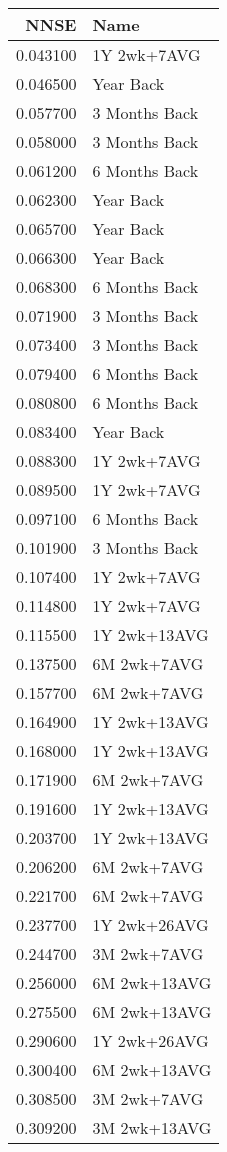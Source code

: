 \begin{tabular}{rl}
NNSE & Name \\
\hline
0.043100 & 1Y 2wk+7AVG \\
0.046500 & Year Back \\
0.057700 & 3 Months Back \\
0.058000 & 3 Months Back \\
0.061200 & 6 Months Back \\
0.062300 & Year Back \\
0.065700 & Year Back \\
0.066300 & Year Back \\
0.068300 & 6 Months Back \\
0.071900 & 3 Months Back \\
0.073400 & 3 Months Back \\
0.079400 & 6 Months Back \\
0.080800 & 6 Months Back \\
0.083400 & Year Back \\
0.088300 & 1Y 2wk+7AVG \\
0.089500 & 1Y 2wk+7AVG \\
0.097100 & 6 Months Back \\
0.101900 & 3 Months Back \\
0.107400 & 1Y 2wk+7AVG \\
0.114800 & 1Y 2wk+7AVG \\
0.115500 & 1Y 2wk+13AVG \\
0.137500 & 6M 2wk+7AVG \\
0.157700 & 6M 2wk+7AVG \\
0.164900 & 1Y 2wk+13AVG \\
0.168000 & 1Y 2wk+13AVG \\
0.171900 & 6M 2wk+7AVG \\
0.191600 & 1Y 2wk+13AVG \\
0.203700 & 1Y 2wk+13AVG \\
0.206200 & 6M 2wk+7AVG \\
0.221700 & 6M 2wk+7AVG \\
0.237700 & 1Y 2wk+26AVG \\
0.244700 & 3M 2wk+7AVG \\
0.256000 & 6M 2wk+13AVG \\
0.275500 & 6M 2wk+13AVG \\
0.290600 & 1Y 2wk+26AVG \\
0.300400 & 6M 2wk+13AVG \\
0.308500 & 3M 2wk+7AVG \\
0.309200 & 3M 2wk+13AVG \\

\end{tabular}
